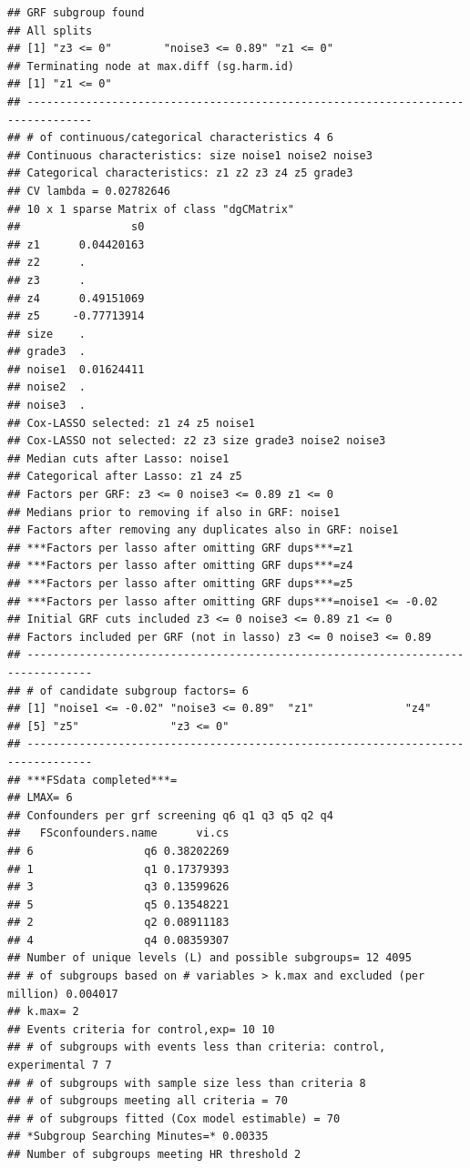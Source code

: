 \documentclass[12pt]{article}
\makeatletter
\newenvironment{kframe}{%
 \def\at@end@of@kframe{}%
 \ifinner\ifhmode%
  \def\at@end@of@kframe{\end{minipage}}%
  \begin{minipage}{\columnwidth}%
 \fi\fi%
 \def\FrameCommand##1{\hskip\@totalleftmargin \hskip-\fboxsep
 \colorbox{shadecolor}{##1}\hskip-\fboxsep
     \hskip-\linewidth \hskip-\@totalleftmargin \hskip\columnwidth}%
 \MakeFramed {\advance\hsize-\width
   \@totalleftmargin\z@ \linewidth\hsize
   \@setminipage}}%
 {\par\unskip\endMakeFramed%
 \at@end@of@kframe}
\newenvironment{knitrout}{}{} %
\makeatother
\begin{document}
\begin{knitrout}
\begin{kframe}
\begin{verbatim}
## GRF subgroup found
## All splits
## [1] "z3 <= 0"        "noise3 <= 0.89" "z1 <= 0"       
## Terminating node at max.diff (sg.harm.id)
## [1] "z1 <= 0"
## --------------------------------------------------------------------------------
## # of continuous/categorical characteristics 4 6 
## Continuous characteristics: size noise1 noise2 noise3 
## Categorical characteristics: z1 z2 z3 z4 z5 grade3 
## CV lambda = 0.02782646 
## 10 x 1 sparse Matrix of class "dgCMatrix"
##                 s0
## z1      0.04420163
## z2      .         
## z3      .         
## z4      0.49151069
## z5     -0.77713914
## size    .         
## grade3  .         
## noise1  0.01624411
## noise2  .         
## noise3  .         
## Cox-LASSO selected: z1 z4 z5 noise1 
## Cox-LASSO not selected: z2 z3 size grade3 noise2 noise3 
## Median cuts after Lasso: noise1 
## Categorical after Lasso: z1 z4 z5 
## Factors per GRF: z3 <= 0 noise3 <= 0.89 z1 <= 0 
## Medians prior to removing if also in GRF: noise1 
## Factors after removing any duplicates also in GRF: noise1 
## ***Factors per lasso after omitting GRF dups***=z1
## ***Factors per lasso after omitting GRF dups***=z4
## ***Factors per lasso after omitting GRF dups***=z5
## ***Factors per lasso after omitting GRF dups***=noise1 <= -0.02
## Initial GRF cuts included z3 <= 0 noise3 <= 0.89 z1 <= 0 
## Factors included per GRF (not in lasso) z3 <= 0 noise3 <= 0.89 
## --------------------------------------------------------------------------------
## # of candidate subgroup factors= 6 
## [1] "noise1 <= -0.02" "noise3 <= 0.89"  "z1"              "z4"             
## [5] "z5"              "z3 <= 0"        
## --------------------------------------------------------------------------------
## ***FSdata completed***=
## LMAX= 6 
## Confounders per grf screening q6 q1 q3 q5 q2 q4 
##   FSconfounders.name      vi.cs
## 6                 q6 0.38202269
## 1                 q1 0.17379393
## 3                 q3 0.13599626
## 5                 q5 0.13548221
## 2                 q2 0.08911183
## 4                 q4 0.08359307
## Number of unique levels (L) and possible subgroups= 12 4095 
## # of subgroups based on # variables > k.max and excluded (per million) 0.004017 
## k.max= 2 
## Events criteria for control,exp= 10 10 
## # of subgroups with events less than criteria: control, experimental 7 7 
## # of subgroups with sample size less than criteria 8 
## # of subgroups meeting all criteria = 70 
## # of subgroups fitted (Cox model estimable) = 70 
## *Subgroup Searching Minutes=* 0.00335 
## Number of subgroups meeting HR threshold 2 

\end{verbatim}
\end{kframe}
\end{knitrout}
\end{document}
